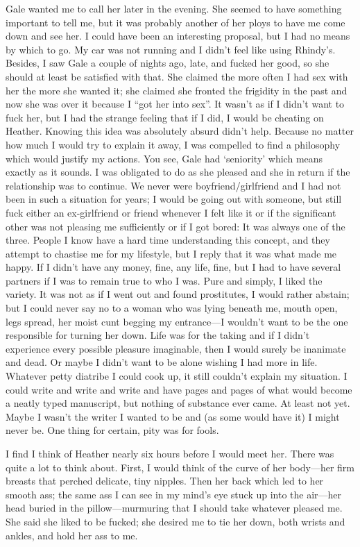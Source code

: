 Gale wanted me to call her later in the evening. She seemed to have
something important to tell me, but it was probably another of her ploys
to have me come down and see her. I could have been an interesting
proposal, but I had no means by which to go. My car was not running and
I didn't feel like using Rhindy's. Besides, I saw Gale a couple of
nights ago, late, and fucked her good, so she should at least be
satisfied with that. She claimed the more often I had sex with her the
more she wanted it; she claimed she fronted the frigidity in the past
and now she was over it because I ``got her into sex''. It wasn't as if
I didn't want to fuck her, but I had the strange feeling that if I did,
I would be cheating on Heather. Knowing this idea was absolutely absurd
didn't help. Because no matter how much I would try to explain it away,
I was compelled to find a philosophy which would justify my actions. You
see, Gale had `seniority' which means exactly as it sounds. I was
obligated to do as she pleased and she in return if the relationship was
to continue. We never were boyfriend/girlfriend and I had not been in
such a situation for years; I would be going out with someone, but still
fuck either an ex-girlfriend or friend whenever I felt like it or if the
significant other was not pleasing me sufficiently or if I got bored: It
was always one of the three. People I know have a hard time
understanding this concept, and they attempt to chastise me for my
lifestyle, but I reply that it was what made me happy. If I didn't have
any money, fine, any life, fine, but I had to have several partners if I
was to remain true to who I was. Pure and simply, I liked the variety.
It was not as if I went out and found prostitutes, I would rather
abstain; but I could never say no to a woman who was lying beneath me,
mouth open, legs spread, her moist cunt begging my entrance---I wouldn't
want to be the one responsible for turning her down. Life was for the
taking and if I didn't experience every possible pleasure imaginable,
then I would surely be inanimate and dead. Or maybe I didn't want to be
alone wishing I had more in life. Whatever petty diatribe I could cook
up, it still couldn't explain my situation. I could write and write and
write and have pages and pages of what would become a neatly typed
manuscript, but nothing of substance ever came. At least not yet. Maybe
I wasn't the writer I wanted to be and (as some would have it) I might
never be. One thing for certain, pity was for fools.

I find I think of Heather nearly six hours before I would meet her.
There was quite a lot to think about. First, I would think of the curve
of her body---her firm breasts that perched delicate, tiny nipples. Then
her back which led to her smooth ass; the same ass I can see in my
mind's eye stuck up into the air---her head buried in the
pillow---murmuring that I should take whatever pleased me. She said she
liked to be fucked; she desired me to tie her down, both wrists and
ankles, and hold her ass to me.


